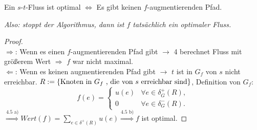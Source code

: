 \begin{satz}
	Ein $s$-$t$-Fluss ist optimal $\Leftrightarrow$ Es gibt keinen $f$-augmentierenden Pfad.
\end{satz}
\textit{Also: stoppt der Algorithmus, dann ist $f$ tatsächlich ein optimaler Fluss.}
\begin{proof}~\\
	$\Rightarrow$: Wenn es einen $f$-augmentierenden Pfad gibt $\to$ 4 berechnet Fluss mit größerem Wert $\Rightarrow$ $f$ war nicht maximal.\\
	$\Leftarrow$: Wenn es keinen augmentierenden Pfad gibt $\to$ $t$ ist in $G_f$ von $s$ nicht erreichbar. $R:= \{\text{Knoten in } G_f \text{ , die von } s \text{ erreichbar sind}\}$, Definition von $G_f$:\\ \begin{equation*}
		f(e) = \begin{cases}
		u(e) & \forall e \in \delta_G^+(R),\\
		0 & \forall e \in \delta_G^-(R).
		\end{cases}
	\end{equation*}
	$\overset{\text{4.5 a)}}{\Rightarrow} Wert(f) = \sum_{e \in \delta^+(R)} u(e) \overset{\text{4.5 b)}}{\Rightarrow} f$ ist optimal.
\end{proof}
